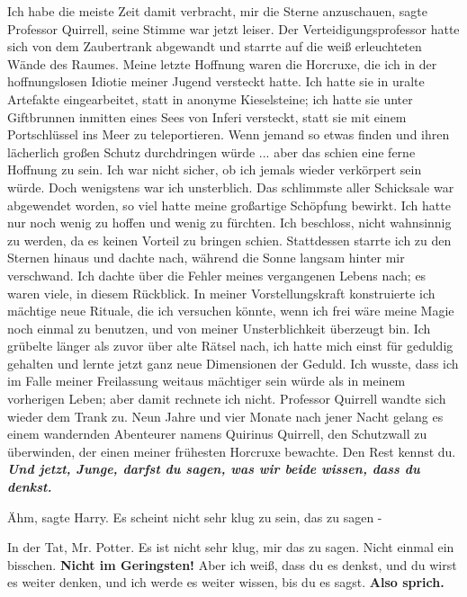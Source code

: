 \glqq{}Ich habe die meiste Zeit damit verbracht, mir die Sterne
anzuschauen\grqq{}, sagte Professor Quirrell, seine Stimme war jetzt leiser. Der
Verteidigungsprofessor hatte sich von dem Zaubertrank abgewandt und starrte auf
die weiß erleuchteten Wände des Raumes. \glqq{}Meine letzte Hoffnung waren die
Horcruxe, die ich in der hoffnungslosen Idiotie meiner Jugend versteckt hatte.
Ich hatte sie in uralte Artefakte eingearbeitet, statt in anonyme Kieselsteine;
ich hatte sie unter Giftbrunnen inmitten eines Sees von Inferi versteckt, statt
sie mit einem Portschlüssel ins Meer zu teleportieren. Wenn jemand so etwas
finden und ihren lächerlich großen Schutz durchdringen würde ... aber das schien
eine ferne Hoffnung zu sein. Ich war nicht sicher, ob ich jemals wieder
verkörpert sein würde. Doch wenigstens war ich unsterblich. Das schlimmste aller
Schicksale war abgewendet worden, so viel hatte meine großartige Schöpfung
bewirkt. Ich hatte nur noch wenig zu hoffen und wenig zu fürchten. Ich
beschloss, nicht wahnsinnig zu werden, da es keinen Vorteil zu bringen schien.
Stattdessen starrte ich zu den Sternen hinaus und dachte nach, während die Sonne
langsam hinter mir verschwand. Ich dachte über die Fehler meines vergangenen
Lebens nach; es waren viele, in diesem Rückblick. In meiner Vorstellungskraft
konstruierte ich mächtige neue Rituale, die ich versuchen könnte, wenn ich frei
wäre meine Magie noch einmal zu benutzen, und von meiner Unsterblichkeit
überzeugt bin. Ich grübelte länger als zuvor über alte Rätsel nach, ich hatte
mich einst für geduldig gehalten und lernte jetzt ganz neue Dimensionen der
Geduld. Ich wusste, dass ich im Falle meiner Freilassung weitaus mächtiger sein
würde als in meinem vorherigen Leben; aber damit rechnete ich nicht.\grqq{} Professor
Quirrell wandte sich wieder dem Trank zu. \glqq{}Neun Jahre und vier Monate nach
jener Nacht gelang es einem wandernden Abenteurer namens Quirinus Quirrell, den
Schutzwall zu überwinden, der einen meiner frühesten Horcruxe bewachte. Den Rest
kennst du. \textbf{\emph{Und jetzt, Junge, darfst du sagen, was wir beide
wissen, dass du denkst.}}\grqq{}

\glqq{}Ähm\grqq{}, sagte Harry. \glqq{}Es scheint nicht sehr klug zu sein, das zu
sagen -\grqq{}

\glqq{}In der Tat, Mr. Potter. Es ist nicht sehr klug, mir das zu sagen. Nicht
einmal ein bisschen. \textbf{Nicht im Geringsten!} Aber ich weiß, dass du es
denkst, und du wirst es weiter denken, und ich werde es weiter wissen, bis du es
sagst. \textbf{Also sprich.}\grqq{}

